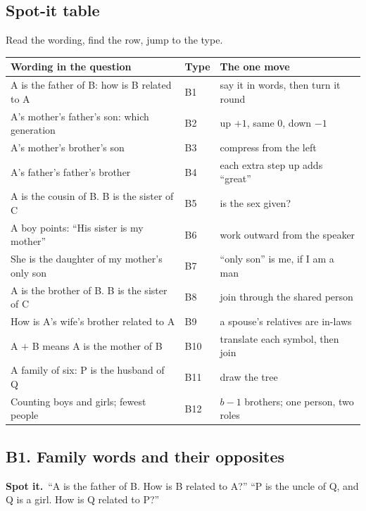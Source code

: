\documentclass[11pt,a4paper]{article}
\let\oldsubsection\subsection
\renewcommand{\subsection}{\needspace{9\baselineskip}\oldsubsection}
\newcommand{\spot}{\textbf{\color{ember}Spot it.}\ }
\begin{document}
\subsection*{Spot-it table}
Read the wording, find the row, jump to the type.
\begin{center}\small\renewcommand{\arraystretch}{1.18}\setlength{\tabcolsep}{7pt}
\begin{tabularx}{\linewidth}{@{}>{\raggedright\arraybackslash}p{8.6cm} l >{\raggedright\arraybackslash}X@{}}
\toprule
\textbf{\color{slate}Wording in the question} & \textbf{\color{slate}Type} & \textbf{\color{slate}The one move} \\ \midrule
A is the father of B: how is B related to A & B1 & say it in words, then turn it round \\
A's mother's father's son: which generation & B2 & up $+1$, same $0$, down $-1$ \\
A's mother's brother's son & B3 & compress from the left \\
A's father's father's brother & B4 & each extra step up adds ``great'' \\
A is the cousin of B. B is the sister of C & B5 & is the sex given? \\
A boy points: ``His sister is my mother'' & B6 & work outward from the speaker \\
She is the daughter of my mother's only son & B7 & ``only son'' is me, if I am a man \\
A is the brother of B. B is the sister of C & B8 & join through the shared person \\
How is A's wife's brother related to A & B9 & a spouse's relatives are in-laws \\
A $+$ B means A is the mother of B & B10 & translate each symbol, then join \\
A family of six: P is the husband of Q & B11 & draw the tree \\
Counting boys and girls; fewest people & B12 & $b-1$ brothers; one person, two roles \\
\bottomrule
\end{tabularx}\end{center}

\subsection{B1. Family words and their opposites}
\spot ``A is the father of B. How is B related to A?'' ``P is the uncle of Q, and Q is a girl. How is Q related to P?''
\end{document}
